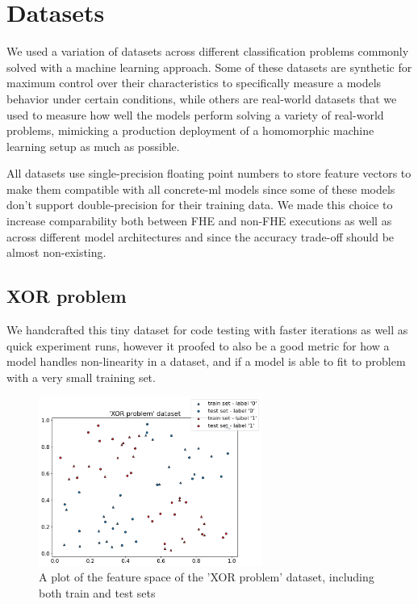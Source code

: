 \section{Datasets}

We used a variation of datasets across different classification problems commonly solved with a machine learning approach. Some of these datasets are synthetic for maximum control over their characteristics to specifically measure a models behavior under certain conditions, while others are real-world datasets that we used to measure how well the models perform solving a variety of real-world problems, mimicking a production deployment of a homomorphic machine learning setup as much as possible.

All datasets use single-precision floating point numbers to store feature vectors to make them compatible with all concrete-ml models since some of these models don't support double-precision for their training data. We made this choice to increase comparability both between FHE and non-FHE executions as well as across different model architectures and since the accuracy trade-off should be almost non-existing.

\subsection{XOR problem}

We handcrafted this tiny dataset for code testing with faster iterations as well as quick experiment runs, however it proofed to also be a good metric for how a model handles non-linearity in a dataset, and if a model is able to fit to problem with a very small training set.

\begin{figure}[h]
    \begin{center}
        \includegraphics[width=0.65\textwidth]{figures/'XOR problem' dataset.png}
    \end{center}
    \caption{A plot of the feature space of the 'XOR problem' dataset, including both train and test sets}
    \label{fig:xor_problem_plot}
\end{figure}

